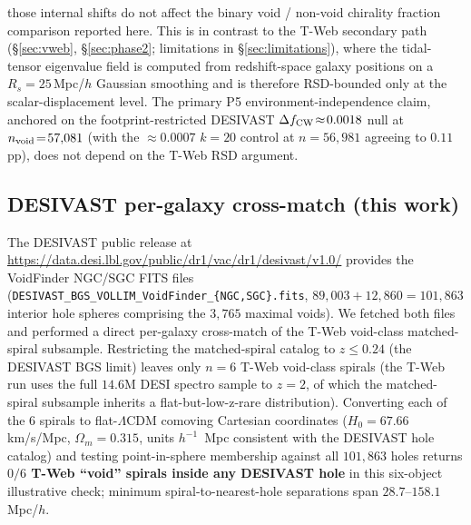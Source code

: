 \documentclass[aps,prd,twocolumn,superscriptaddress,showpacs,preprintnumbers,nofootinbib,longbibliography,floatfix]{revtex4-2}
\begin{document}
those internal shifts do not affect the binary void / non-void
chirality fraction comparison reported here. This is in contrast to the T-Web secondary
path (\S\ref{sec:vweb}, \S\ref{sec:phase2}; limitations in
\S\ref{sec:limitations}), where the tidal-tensor eigenvalue
field is computed from redshift-space galaxy positions on a
$R_s\!=\!25$\,Mpc/$h$ Gaussian smoothing and is therefore
RSD-bounded only at the scalar-displacement level. The primary
P5 environment-independence claim, anchored on the footprint-restricted
DESIVAST $\Delta f_{\rm CW}\!\approx\!0.0018$ null at
$n_{\rm void}\!=\!57{,}081$ (with the $\approx\!0.0007$ $k\!=\!20$
control at $n\!=\!56{,}981$ agreeing to $0.11$\,pp), does not depend on
the T-Web RSD argument.

\subsection{DESIVAST per-galaxy cross-match (this work)}\label{sec:desivast_xmatch}

The DESIVAST
public release at
\url{https://data.desi.lbl.gov/public/dr1/vac/dr1/desivast/v1.0/}
provides the VoidFinder NGC/SGC FITS files
(\texttt{DESIVAST\_BGS\_VOLLIM\_VoidFinder\_\{NGC,SGC\}.fits},
$89{,}003 + 12{,}860 = 101{,}863$ interior hole spheres comprising the
$3{,}765$ maximal voids). We fetched both files and performed a direct
per-galaxy cross-match of the T-Web void-class matched-spiral
subsample. Restricting the matched-spiral catalog to $z \leq 0.24$
(the DESIVAST BGS limit) leaves only $n = 6$ T-Web void-class spirals
(the T-Web run uses the full $14.6$M DESI spectro sample to $z = 2$,
of which the matched-spiral subsample inherits a flat-but-low-z-rare
distribution). Converting each of the 6 spirals to flat-$\Lambda$CDM
comoving Cartesian coordinates ($H_0 = 67.66$ km/s/Mpc, $\Omega_m =
0.315$, units $h^{-1}$~Mpc consistent with the DESIVAST hole catalog)
and testing point-in-sphere membership against all $101{,}863$ holes
returns \textbf{$0/6$ T-Web ``void'' spirals inside any DESIVAST hole}
in this six-object illustrative check;
minimum spiral-to-nearest-hole separations span $28.7$--$158.1\,$Mpc/$h$.
\end{document}
